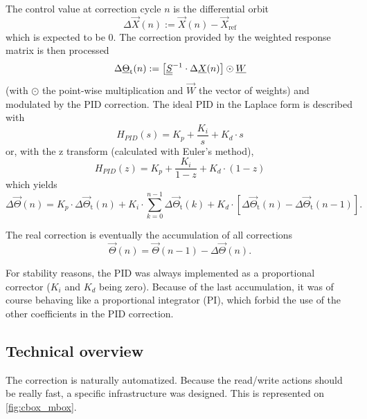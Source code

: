 The control value at correction cycle $n$ is the differential orbit
\begin{equation}
 \Delta \vec{X}(n) := \vec{X}(n)-\vec{X}_\text{ref}
\end{equation}
which is expected to be 0. The correction provided by the weighted response matrix is then processed
\begin{equation}
\Delta \underline{\Theta}_\text{t}(n) :=  \left[ \underline{\underline{S}}^{-1} \cdot \Delta \underline{X}(n) \right] \odot \underline{W}
\end{equation}
(with $\odot$ the point-wise multiplication and $\vec{W}$ the vector of weights) and modulated by the PID correction. The ideal PID in the Laplace form is described with
\begin{equation}
H_{PID}(s) = K_p + \frac{K_i}{s} + K_d \cdot s
\end{equation}
or, with the z transform (calculated with Euler's method),
\begin{equation}
H_{PID}(z) = K_p + \frac{K_i}{1-z} + K_d \cdot (1-z)
\end{equation}
which yields
\begin{equation}
\Delta \vec{\Theta}(n) =  K_p \cdot \Delta \vec{\Theta}_\text{t}(n) + K_i \cdot \sum\limits_{k=0}^{n-1}\Delta \vec{\Theta}_\text{t}(k) + K_d \cdot \left[\Delta \vec{\Theta}_\text{t}(n) - \Delta \vec{\Theta}_\text{t}(n-1)\right].
\end{equation}

The real correction is eventually the accumulation of all corrections
\begin{equation}
\vec{\Theta}(n) = \vec{\Theta}(n-1) - \Delta \vec{\Theta}(n).
\end{equation}

For stability reasons, the PID was always implemented as a proportional corrector ($K_i$ and $K_d$ being zero). Because of the last accumulation, it was of course behaving like a proportional integrator (PI), which forbid the use of the other coefficients in the PID correction. 

\subsection{Technical overview}
\label{sec:correction_sa_technical}
The correction is naturally automatized. Because the read/write actions should be really fast, a specific infrastructure was designed. This is represented on \cref{fig:cbox_mbox}.

